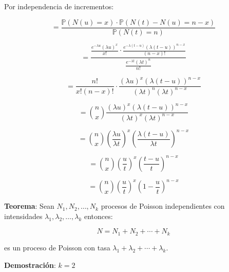 \documentclass[12pt]{article}
\begin{document}
Por independencia de incrementos:

\begin{equation*}
= \frac{\mathbb{P}(N(u) = x) \cdot \mathbb{P}(N(t) - N(u) = n - x)}{\mathbb{P}(N(t) = n)}
\end{equation*}

\begin{equation*}
= \frac{\frac{e^{-\lambda u} (\lambda u)^x}{x!} \cdot \frac{e^{-\lambda(t-u)} (\lambda(t-u))^{n-x}}{(n-x)!}}{\frac{e^{-\lambda t} (\lambda t)^n}{n!}}
\end{equation*}

\begin{equation*}
= \frac{n!}{x!(n-x)!} \cdot \frac{(\lambda u)^x (\lambda(t-u))^{n-x}}{(\lambda t)^n (\lambda t)^{n-x}}
\end{equation*}

\begin{equation*}
= \binom{n}{x} \frac{(\lambda u)^x (\lambda(t-u))^{n-x}}{(\lambda t)^x (\lambda t)^{n-x}}
\end{equation*}

\begin{equation*}
= \binom{n}{x} \left(\frac{\lambda u}{\lambda t}\right)^x \left(\frac{\lambda(t-u)}{\lambda t}\right)^{n-x}
\end{equation*}

\begin{equation*}
= \binom{n}{x} \left(\frac{u}{t}\right)^x \left(\frac{t-u}{t}\right)^{n-x}
\end{equation*}

\begin{equation*}
= \binom{n}{x} \left(\frac{u}{t}\right)^x \left(1 - \frac{u}{t}\right)^{n-x}
\end{equation*}

\textbf{Teorema}: Sean $N_1, N_2, \ldots, N_k$ procesos de Poisson independientes con intensidades $\lambda_1, \lambda_2, \ldots, \lambda_k$ entonces:

\begin{equation*}
N = N_1 + N_2 + \cdots + N_k
\end{equation*}

es un proceso de Poisson con tasa $\lambda_1 + \lambda_2 + \cdots + \lambda_k$.

\textbf{Demostración}: $k = 2$
\end{document}
